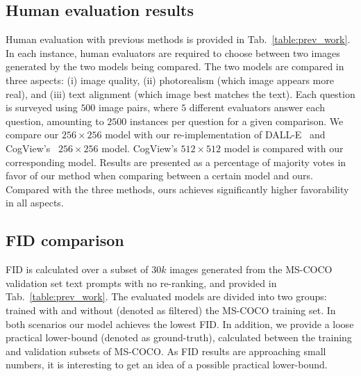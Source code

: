 \documentclass[final]{cvpr}
\begin{document}
\subsection{Human evaluation results} Human evaluation with previous methods is provided in Tab.~\ref{table:prev_work}. In each instance, human evaluators are required to choose between two images generated by the two models being compared. The two models are compared in three aspects: (i) image quality, (ii) photorealism (which image appears more real), and (iii) text alignment (which image best matches the text). Each question is surveyed using $500$ image pairs, where $5$ different evaluators answer each question, amounting to $2500$ instances per question for a given comparison.
We compare our $256\times256$ model with our re-implementation of DALL-E~\cite{ramesh2021zero} and CogView's~\cite{ding2021cogview} $256\times256$ model. CogView's $512\times512$ model is compared with our corresponding model. Results are presented as a percentage of majority votes in favor of our method when comparing between a certain model and ours. Compared with the three methods, ours achieves significantly higher favorability in all aspects.

\subsection{FID comparison} FID is calculated over a subset of $30k$ images generated from the MS-COCO validation set text prompts with no re-ranking, and provided in Tab.~\ref{table:prev_work}. The evaluated models are divided into two groups: trained with and without (denoted as filtered) the MS-COCO training set. In both scenarios our model achieves the lowest FID. In addition, we provide a loose practical lower-bound (denoted as ground-truth), calculated between the training and validation
subsets of MS-COCO. As FID results are approaching small numbers, it is interesting to get an idea of a possible practical lower-bound.
\end{document}
